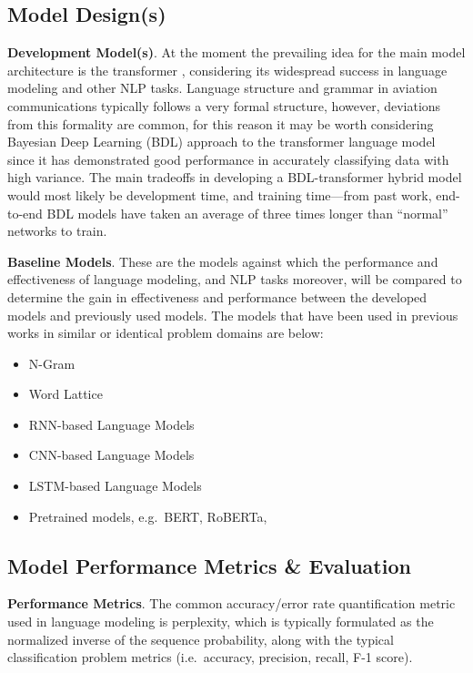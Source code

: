 \documentclass[10pt]{article}
\begin{document}
        \subsection{Model Design(s)}
        \textbf{Development Model(s)}. At the moment the prevailing idea for the main model architecture is the transformer
        \cite{vaswani_attention_2017}, considering its widespread success in language modeling and other NLP tasks. Language structure
        and grammar in aviation communications typically follows a very formal structure, however, deviations from this formality are
        common, for this reason it may be worth considering Bayesian Deep Learning (BDL) approach to the transformer language model
        since it has demonstrated good performance in accurately classifying data with high variance. The main tradeoffs in developing
        a BDL-transformer hybrid model would most likely be development time, and training time---from past work, end-to-end BDL models
        have taken an average of three times longer than ``normal'' networks to train.


        \textbf{Baseline Models}. These are the models against which the performance and effectiveness of language modeling, and NLP
        tasks moreover, will be compared to determine the gain in effectiveness and performance between the developed models and
        previously used models. The models that have been used in previous works in similar or identical problem domains are below:

        \begin{multicols}{2}
            \begin{itemize}
                \item N-Gram
                \item Word Lattice
                \item RNN-based Language Models
                \item CNN-based Language Models
                \item LSTM-based Language Models
                \item Pretrained models, e.g.~BERT, RoBERTa,
            \end{itemize}
        \end{multicols}


        \subsection{Model Performance Metrics \& Evaluation}
        \textbf{Performance Metrics}.
        The common accuracy/error rate quantification metric used in language modeling is perplexity, which is typically formulated as
        the normalized inverse of the sequence probability, along with the typical classification problem metrics (i.e.~accuracy,
        precision, recall, F-1 score).
\end{document}

